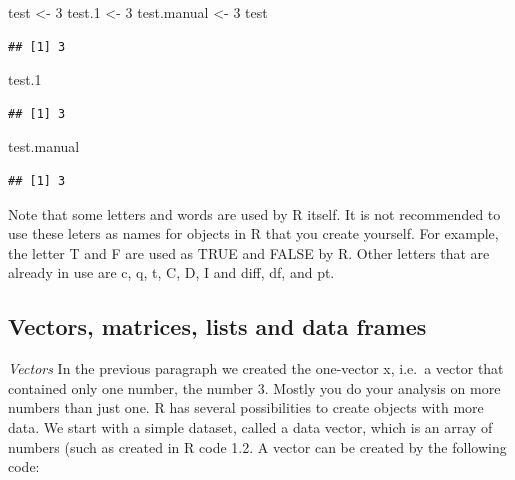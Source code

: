 \documentclass[]{book}
\newenvironment{Shaded}{\begin{snugshade}}{\end{snugshade}}
\newcommand{\DecValTok}[1]{\textcolor[rgb]{0.00,0.00,0.81}{#1}}
\newcommand{\StringTok}[1]{\textcolor[rgb]{0.31,0.60,0.02}{#1}}
\newcommand{\NormalTok}[1]{#1}
\theoremstyle{definition}
\theoremstyle{definition}
\theoremstyle{definition}
\theoremstyle{remark}
\begin{document}
\begin{Shaded}
\begin{Highlighting}[]
\NormalTok{test <-}\StringTok{ }\DecValTok{3}
\NormalTok{test.}\DecValTok{1}\NormalTok{ <-}\StringTok{ }\DecValTok{3}
\NormalTok{test.manual <-}\StringTok{ }\DecValTok{3}
\NormalTok{test}
\end{Highlighting}
\end{Shaded}

\begin{verbatim}
## [1] 3
\end{verbatim}

\begin{Shaded}
\begin{Highlighting}[]
\NormalTok{test.}\DecValTok{1}
\end{Highlighting}
\end{Shaded}

\begin{verbatim}
## [1] 3
\end{verbatim}

\begin{Shaded}
\begin{Highlighting}[]
\NormalTok{test.manual }
\end{Highlighting}
\end{Shaded}

\begin{verbatim}
## [1] 3
\end{verbatim}

Note that some letters and words are used by R itself. It is not
recommended to use these leters as names for objects in R that you
create yourself. For example, the letter T and F are used as TRUE and
FALSE by R. Other letters that are already in use are c, q, t, C, D, I
and diff, df, and pt.

\subsection{Vectors, matrices, lists and data
frames}\label{vectors-matrices-lists-and-data-frames}

\emph{Vectors} In the previous paragraph we created the one-vector x,
i.e.~a vector that contained only one number, the number 3. Mostly you
do your analysis on more numbers than just one. R has several
possibilities to create objects with more data. We start with a simple
dataset, called a data vector, which is an array of numbers (such as
created in R code 1.2. A vector can be created by the following code:
\end{document}
